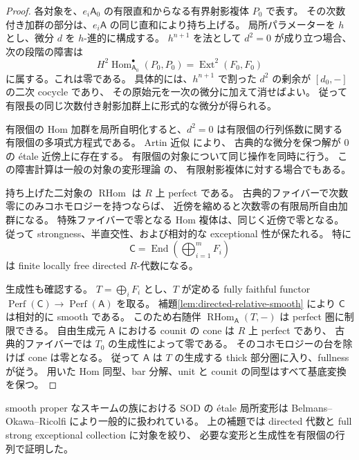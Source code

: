 \begin{proof}
各対象を、$e_i\mathsf A_0$ の有限直和からなる有界射影複体 $P_0$ で表す。
その次数付き加群の部分は、$e_i\mathsf A$ の同じ直和により持ち上げる。
局所パラメーターを $h$ とし、微分 $d$ を $h$-進的に構成する。
$h^{n+1}$ を法として $d^2=0$ が成り立つ場合、次の段階の障害は
\[
 H^2\operatorname{Hom}^{\bullet}_{\mathsf A_0}(P_0,P_0)
 =\operatorname{Ext}^2(F_0,F_0)
\]
に属する。これは零である。
具体的には、$h^{n+1}$ で割った $d^2$ の剰余が $[d_0,-]$ の二次 cocycle であり、
その原始元を一次の微分に加えて消せばよい。
従って有限長の同じ次数付き射影加群上に形式的な微分が得られる。

有限個の Hom 加群を局所自明化すると、$d^2=0$ は有限個の行列係数に関する
有限個の多項式方程式である。
Artin 近似 \cite[定理16.13.2]{RelativeArtin} により、
古典的な微分を保つ解が $0$ の \'etale 近傍上に存在する。
有限個の対象について同じ操作を同時に行う。
この障害計算は一般の対象の変形理論 \cite{RelativeLowen} の、
有限射影複体に対する場合でもある。

持ち上げた二対象の $\operatorname{RHom}$ は $R$ 上 perfect である。
古典的ファイバーで次数零にのみコホモロジーを持つならば、
近傍を縮めると次数零の有限局所自由加群になる。
特殊ファイバーで零となる Hom 複体は、同じく近傍で零となる。
従って strongness、半直交性、および相対的な exceptional 性が保たれる。
特に
\[
 \mathsf C=\operatorname{End}\!\left(\bigoplus_{i=1}^mF_i\right)
\]
は finite locally free directed $R$-代数になる。

生成性も確認する。
$T=\bigoplus_iF_i$ とし、$T$ が定める fully faithful functor
$\operatorname{Perf}(\mathsf C)\to\operatorname{Perf}(\mathsf A)$ を取る。
補題\ref{lem:directed-relative-smooth} により $\mathsf C$ は相対的に smooth である。
このため右随伴 $\operatorname{RHom}_{\mathsf A}(T,-)$ は perfect 圏に制限できる。
自由生成元 $\mathsf A$ における counit の cone は $R$ 上 perfect であり、
古典的ファイバーでは $T_0$ の生成性によって零である。
そのコホモロジーの台を除けば cone は零となる。
従って $\mathsf A$ は $T$ の生成する thick 部分圏に入り、fullness が従う。
用いた Hom 同型、bar 分解、unit と counit の同型はすべて基底変換を保つ。
\end{proof}

\begin{remark}
smooth proper なスキームの族における SOD の \'etale 局所変形は
Belmans--Okawa--Ricolfi \cite{RelativeBOR} により一般的に扱われている。
上の補題では directed 代数と full strong exceptional collection に対象を絞り、
必要な変形と生成性を有限個の行列で証明した。
\end{remark}

